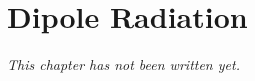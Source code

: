 \chapter{Dipole Radiation}\label{ch:b2:dipole-radiation}


\emph{This chapter has not been written yet.}
